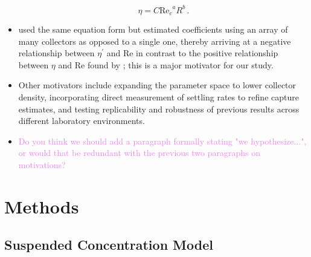 \documentclass{article}
\newcommand\Rey{\mathrm{Re}}
\begin{document}
\begin{itemize}
        \begin{equation}
            \eta=C{\Rey_c}^{a}R^{b}\,.
            \label{eq:powerlaw}
        \end{equation}
    \item \cite{Fauria_2015} used the same equation form but estimated coefficients using an array of many collectors as opposed to a single one, thereby arriving at a negative relationship between $\eta^\prime$ and $\Rey$ in contrast to the positive relationship between $\eta$ and $\Rey$ found by \cite{Palmer_2004}; this is a major motivator for our study. 
    \item Other motivators include expanding the parameter space to lower collector density, incorporating direct measurement of settling rates to refine capture estimates, and testing replicability and robustness of previous results across different laboratory environments.
    \item \textcolor{violet}{Do you think we should add a paragraph formally stating "we hypothesize...", or would that be redundant with the previous two paragraphs on motivations?}
\end{itemize}

\section{Methods}

\subsection{Suspended Concentration Model}
\end{document}
